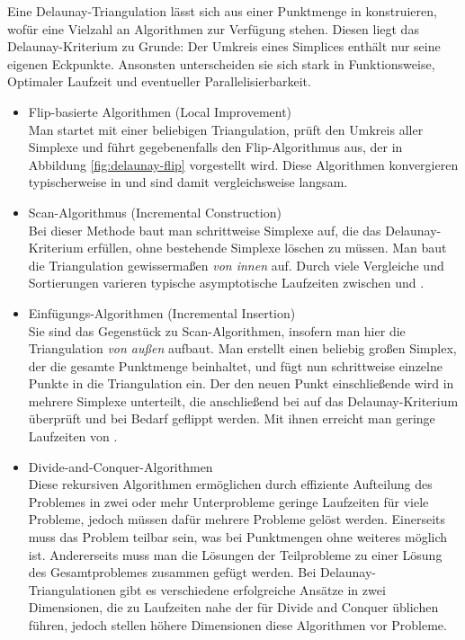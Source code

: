 Eine Delaunay-Triangulation lässt sich aus einer Punktmenge in  konstruieren, wofür eine Vielzahl an Algorithmen zur Verfügung stehen. 
Diesen liegt das Delaunay-Kriterium zu Grunde:
Der Umkreis eines Simplices enthält nur seine eigenen Eckpunkte.
Ansonsten unterscheiden sie sich stark in Funktionsweise, Optimaler Laufzeit  und eventueller Parallelisierbarkeit.

\begin{itemize}
\item Flip-basierte Algorithmen (Local Improvement)\\
  Man startet mit einer beliebigen Triangulation, prüft den Umkreis aller Simplexe und führt gegebenenfalls den Flip-Algorithmus aus, der in Abbildung \ref{fig:delaunay-flip} vorgestellt wird.
  Diese Algorithmen konvergieren typischerweise in  und sind damit vergleichsweise langsam.

\item Scan-Algorithmus (Incremental Construction)\\
  Bei dieser Methode baut man schrittweise Simplexe auf, die das Delaunay-Kriterium erfüllen, ohne bestehende Simplexe löschen zu müssen.
  Man baut die Triangulation gewissermaßen \textit{von innen} auf.
  Durch viele Vergleiche und Sortierungen varieren typische asymptotische Laufzeiten zwischen  und .

\item Einfügungs-Algorithmen (Incremental Insertion)\\
  Sie sind das Gegenstück zu Scan-Algorithmen, insofern man hier die Triangulation \textit{von außen} aufbaut.
  Man erstellt einen beliebig großen Simplex, der die gesamte Punktmenge beinhaltet, und fügt nun schrittweise einzelne Punkte in die Triangulation ein.
  Der den neuen Punkt einschließende wird in mehrere Simplexe unterteilt, die anschließend bei auf das Delaunay-Kriterium überprüft und bei Bedarf geflippt werden.
  Mit ihnen erreicht man geringe Laufzeiten von .

\item Divide-and-Conquer-Algorithmen\\
  Diese rekursiven Algorithmen ermöglichen durch effiziente Aufteilung des Problemes in zwei oder mehr Unterprobleme geringe Laufzeiten für viele Probleme, jedoch müssen dafür mehrere Probleme gelöst werden.
  Einerseits muss das Problem teilbar sein, was bei Punktmengen ohne weiteres möglich ist.
  Andererseits muss man die Lösungen der Teilprobleme zu einer Lösung des Gesamtproblemes zusammen gefügt werden.
  Bei Delaunay-Triangulationen gibt es verschiedene erfolgreiche Ansätze in zwei Dimensionen, die zu Laufzeiten nahe der für Divide and Conquer üblichen  führen, jedoch stellen höhere Dimensionen diese Algorithmen vor Probleme.


\end{itemize}
